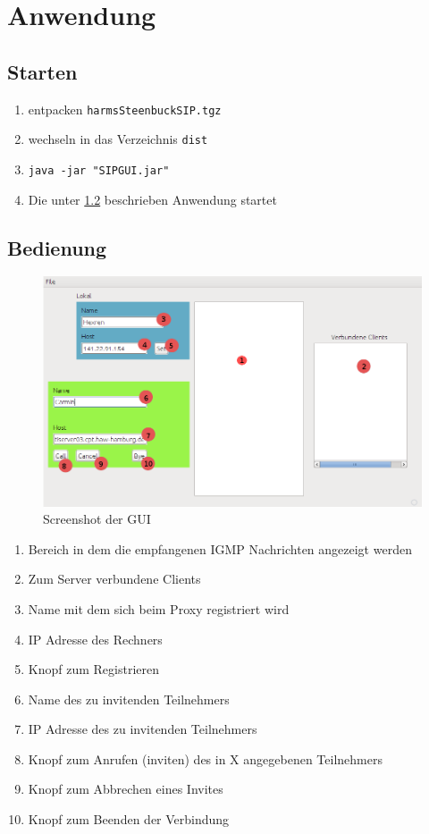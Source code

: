 \documentclass[10pt]{scrartcl}
\begin{document}
\section{Anwendung}

\subsection{Starten}
\begin{enumerate}
	\item entpacken \verb!harmsSteenbuckSIP.tgz!
	\item wechseln in das Verzeichnis \verb!dist!
	\item \verb!java -jar "SIPGUI.jar"!
	\item Die unter \ref{sec:bedienung:anwendung} beschrieben Anwendung startet
\end{enumerate}


\subsection{Bedienung}
\label{sec:bedienung:anwendung}		
	\begin{figure}[H]
        \centering
                \includegraphics[width=\textwidth]{img/screenshotApplication}
        \caption{Screenshot der GUI}
        \label{img:gui}
	\end{figure}

\begin{enumerate}
	\item Bereich in dem die empfangenen IGMP Nachrichten angezeigt werden
	\item Zum Server verbundene Clients
	\item Name mit dem sich beim Proxy registriert wird
	\item IP Adresse des Rechners
	\item Knopf zum Registrieren
	\item Name des zu invitenden Teilnehmers
	\item IP Adresse des zu invitenden Teilnehmers
	\item Knopf zum Anrufen (inviten) des in X angegebenen Teilnehmers
	\item Knopf zum Abbrechen eines Invites
	\item Knopf zum Beenden der Verbindung
\end{enumerate}
\end{document}

